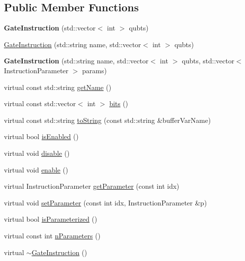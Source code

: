 \subsection*{Public Member Functions}
\begin{DoxyCompactItemize}
\item 
{\bfseries Gate\+Instruction} (std\+::vector$<$ int $>$ qubts)\hypertarget{a00033_a951ac3f44fcfbcf187bb73ba7438b472}{}\label{a00033_a951ac3f44fcfbcf187bb73ba7438b472}

\item 
\hyperlink{a00033_a9b8543b79576c69ab8578ab6228134d7}{Gate\+Instruction} (std\+::string name, std\+::vector$<$ int $>$ qubts)
\item 
{\bfseries Gate\+Instruction} (std\+::string name, std\+::vector$<$ int $>$ qubts, std\+::vector$<$ Instruction\+Parameter $>$ params)\hypertarget{a00033_a37aaeebdb14747b0afd7d00cf285343e}{}\label{a00033_a37aaeebdb14747b0afd7d00cf285343e}

\item 
virtual const std\+::string \hyperlink{a00033_a0db03b9e46eeba1134f0ca2b83ccc842}{get\+Name} ()
\item 
virtual const std\+::vector$<$ int $>$ \hyperlink{a00033_ad32ad03dfc516e00093030e60178003d}{bits} ()
\item 
virtual const std\+::string \hyperlink{a00033_a089a5da67ff40ac1a6f56e64589822d9}{to\+String} (const std\+::string \&buffer\+Var\+Name)
\item 
virtual bool \hyperlink{a00033_a0a821be322b0c848b01c55f91fc8f484}{is\+Enabled} ()
\item 
virtual void \hyperlink{a00033_a63ce138dd71fb43d303f5600fefb7215}{disable} ()
\item 
virtual void \hyperlink{a00033_a7a80474b7fd465271b3313432db2e608}{enable} ()
\item 
virtual Instruction\+Parameter \hyperlink{a00033_addd6185279fe99fbdc3d4efd96e42162}{get\+Parameter} (const int idx)
\item 
virtual void \hyperlink{a00033_afb8f7582d7520c77d61b9016753f5669}{set\+Parameter} (const int idx, Instruction\+Parameter \&p)
\item 
virtual bool \hyperlink{a00033_afe7aeeb398262931e156bcb3950f8188}{is\+Parameterized} ()
\item 
virtual const int \hyperlink{a00033_a3752912b2c402668ca4814e21d4bbd26}{n\+Parameters} ()
\item 
virtual \hyperlink{a00033_ab8a75144074b27262fc33c77db4528b7}{$\sim$\+Gate\+Instruction} ()
\end{DoxyCompactItemize}
